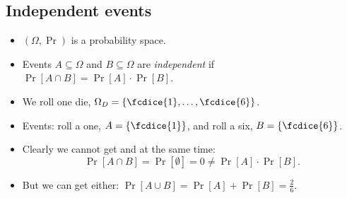 \subsection{Independent events}

\begin{frame}
  \begin{definition}
    \begin{itemize}
      \item \((\Omega, \Pr)\) is a probability space.
      \item Events \(A\subseteq \Omega\) and \(B\subseteq \Omega\) are 
        \emph{independent} if \(\Pr[A\cap B] = \Pr[A]\cdot \Pr[B]\).
    \end{itemize}
  \end{definition}
\end{frame}

\begin{frame}
  \begin{example}
    \begin{itemize}
      \item We roll one die, \(\Omega_D = \{\fcdice{1}, \ldots, \fcdice{6}\}\).
      \item Events: roll a one, \(A = \{\fcdice{1}\}\), and roll a six, \(B 
          = \{\fcdice{6}\}\).

        \pause{}

      \item Clearly we cannot get  and  at the same time:
        \[\Pr[A\cap B] = \Pr[\emptyset] = 0 \neq \Pr[A]\cdot \Pr[B].\]

      \item But we can get either: \(\Pr[A\cup B] = \Pr[A] + \Pr[B] 
          = \frac{2}{6}\).
    \end{itemize}
  \end{example}
\end{frame}


